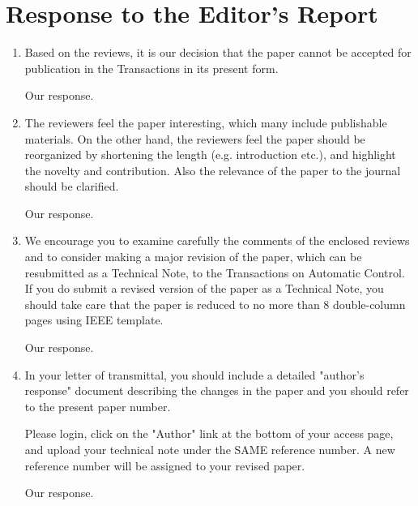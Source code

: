 \documentclass[a4paper]{scrartcl}
\newenvironment{rebuttal}{\begin{enumerate}[label={\color{grey}\thesection.\arabic{enumi}},leftmargin=0pt,ref=\thesection.\arabic{enumi}]}{\end{enumerate}}
\newcommand{\reviewtext}[1]{{\color{nblue} #1}}
\begin{document}
\section*{Response to the Editor's Report}
\def\thesection{E}
\begin{rebuttal} %
\item \reviewtext{Based on the reviews, it is our decision that the paper cannot be accepted for publication in the Transactions in its present form.}

Our response.

\item \reviewtext{The reviewers feel the paper interesting, which many include publishable materials. On the other hand, the reviewers feel the paper should be reorganized by shortening the length (e.g. introduction etc.), and highlight the novelty and contribution. Also the relevance of the paper to the journal should be clarified.}

Our response.

\item \reviewtext{We encourage you to examine carefully the comments of the enclosed reviews and to consider making a major revision of the paper, which can be resubmitted as a Technical Note, to the Transactions on Automatic Control.  If you do submit a revised version of the paper as a Technical Note, you should take care that the paper is reduced to no
more than 8 double-column pages using IEEE template.}

Our response.

\item \reviewtext{In your letter of transmittal, you should include a detailed "author's response" document describing the changes in the paper and you should refer to the present paper number.

Please login, click on the "Author" link at the bottom of your access page, and upload your technical note under the SAME reference number. A new reference number will be assigned to your revised paper.}

Our response.

\end{rebuttal}

\end{document}
